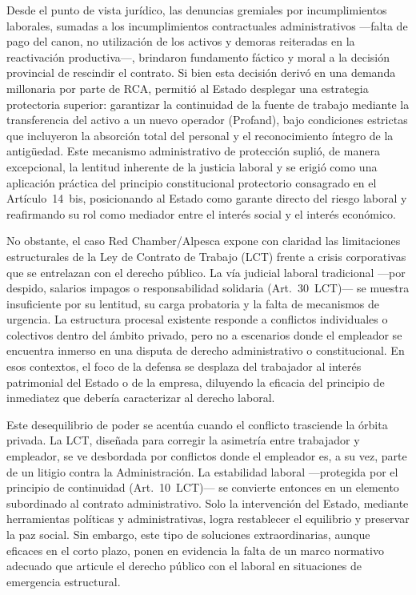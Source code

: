 \documentclass[]{informeutn}
\begin{document}
    Desde el punto de vista jurídico, las denuncias gremiales por incumplimientos laborales, sumadas a los
    incumplimientos contractuales administrativos —falta de pago del canon, no utilización de los activos y demoras
    reiteradas en la reactivación productiva—, brindaron fundamento fáctico y moral a la decisión provincial de
    rescindir el contrato. Si bien esta decisión derivó en una demanda millonaria por parte de RCA, permitió al Estado
    desplegar una estrategia protectoria superior: garantizar la continuidad de la fuente de trabajo mediante la
    transferencia del activo a un nuevo operador (Profand), bajo condiciones estrictas que incluyeron la absorción total
    del personal y el reconocimiento íntegro de la antigüedad. Este mecanismo administrativo de protección suplió, de
    manera excepcional, la lentitud inherente de la justicia laboral y se erigió como una aplicación práctica del
    principio constitucional protectorio consagrado en el Artículo~14~bis, posicionando al Estado como garante directo
    del riesgo laboral y reafirmando su rol como mediador entre el interés social y el interés económico.

    No obstante, el caso Red Chamber/Alpesca expone con claridad las limitaciones estructurales de la Ley de Contrato de
    Trabajo (LCT) frente a crisis corporativas que se entrelazan con el derecho público. La vía judicial laboral
    tradicional —por despido, salarios impagos o responsabilidad solidaria (Art.~30~LCT)— se muestra insuficiente por su
    lentitud, su carga probatoria y la falta de mecanismos de urgencia. La estructura procesal existente responde a
    conflictos individuales o colectivos dentro del ámbito privado, pero no a escenarios donde el empleador se encuentra
    inmerso en una disputa de derecho administrativo o constitucional. En esos contextos, el foco de la defensa se
    desplaza del trabajador al interés patrimonial del Estado o de la empresa, diluyendo la eficacia del principio de
    inmediatez que debería caracterizar al derecho laboral.

    Este desequilibrio de poder se acentúa cuando el conflicto trasciende la órbita privada. La LCT, diseñada para
    corregir la asimetría entre trabajador y empleador, se ve desbordada por conflictos donde el empleador es, a su vez,
    parte de un litigio contra la Administración. La estabilidad laboral —protegida por el principio de continuidad
    (Art.~10~LCT)— se convierte entonces en un elemento subordinado al contrato administrativo. Solo la intervención del
    Estado, mediante herramientas políticas y administrativas, logra restablecer el equilibrio y preservar la paz
    social. Sin embargo, este tipo de soluciones extraordinarias, aunque eficaces en el corto plazo, ponen en evidencia
    la falta de un marco normativo adecuado que articule el derecho público con el laboral en situaciones de emergencia
    estructural.
\end{document}
